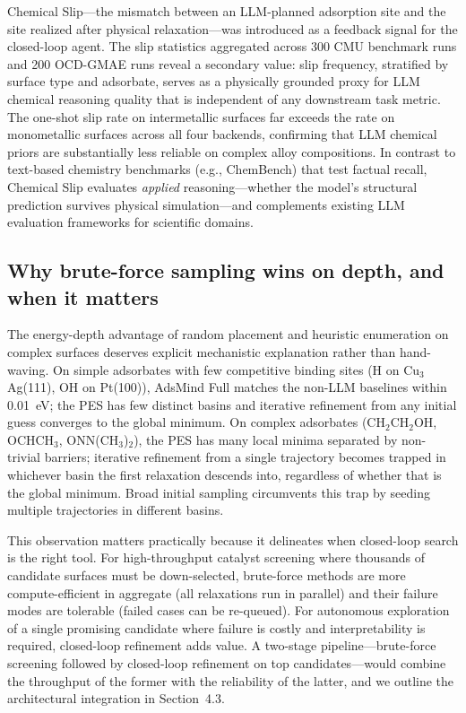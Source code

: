 Chemical Slip---the mismatch between an LLM-planned adsorption site and the site realized after physical relaxation---was introduced as a feedback signal for the closed-loop agent.
The slip statistics aggregated across 300 CMU benchmark runs and 200 OCD-GMAE runs reveal a secondary value: slip frequency, stratified by surface type and adsorbate, serves as a physically grounded proxy for LLM chemical reasoning quality that is independent of any downstream task metric.
The one-shot slip rate on intermetallic surfaces far exceeds the rate on monometallic surfaces across all four backends, confirming that LLM chemical priors are substantially less reliable on complex alloy compositions.
In contrast to text-based chemistry benchmarks (e.g., ChemBench) that test factual recall, Chemical Slip evaluates \textit{applied} reasoning---whether the model's structural prediction survives physical simulation---and complements existing LLM evaluation frameworks for scientific domains.

\subsection{Why brute-force sampling wins on depth, and when it matters}

The energy-depth advantage of random placement and heuristic enumeration on complex surfaces deserves explicit mechanistic explanation rather than hand-waving.
On simple adsorbates with few competitive binding sites (H on Cu$_3$Ag(111), OH on Pt(100)), AdsMind Full matches the non-LLM baselines within 0.01~eV; the PES has few distinct basins and iterative refinement from any initial guess converges to the global minimum.
On complex adsorbates (CH$_2$CH$_2$OH, OCHCH$_3$, ONN(CH$_3$)$_2$), the PES has many local minima separated by non-trivial barriers; iterative refinement from a single trajectory becomes trapped in whichever basin the first relaxation descends into, regardless of whether that is the global minimum.
Broad initial sampling circumvents this trap by seeding multiple trajectories in different basins.

This observation matters practically because it delineates when closed-loop search is the right tool.
For high-throughput catalyst screening where thousands of candidate surfaces must be down-selected, brute-force methods are more compute-efficient in aggregate (all relaxations run in parallel) and their failure modes are tolerable (failed cases can be re-queued).
For autonomous exploration of a single promising candidate where failure is costly and interpretability is required, closed-loop refinement adds value.
A two-stage pipeline---brute-force screening followed by closed-loop refinement on top candidates---would combine the throughput of the former with the reliability of the latter, and we outline the architectural integration in Section~4.3.

